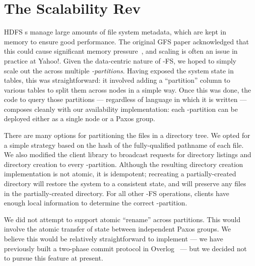 \section{The Scalability Rev}
\label{sec:scale}

HDFS {\NN}s manage large amounts of file system metadata, which are kept in
memory to ensure good performance. The original GFS paper acknowledged that this
could cause significant memory pressure~\cite{gfs-sosp}, and \NN scaling is
often an issue in practice at Yahoo!.  Given the data-centric nature of
\BOOM-FS, we hoped to simply scale out the \NN across multiple
\emph{\NN-partitions}. Having exposed the system state in tables, this was
straightforward: it involved adding a ``partition'' column to various tables to
split them across nodes in a simple way. Once this was done, the code to query
those partitions --- regardless of language in which it is written --- composes
cleanly with our availability implementation: each \NN-partition can be deployed
either as a single node or a Paxos group.

There are many options for partitioning the files in a directory tree.  We opted
for a simple strategy based on the hash of the fully-qualified pathname of each
file.  We also modified the client library to broadcast requests for directory
listings and directory creation to every \NN-partition.  Although the resulting
directory creation implementation is not atomic, it is idempotent; recreating a
partially-created directory will restore the system to a consistent state, and
will preserve any files in the partially-created directory. For all other
\BOOM-FS operations, clients have enough local information to determine the
correct \NN-partition. 

We did not attempt to support atomic ``rename'' across partitions. This would
involve the atomic transfer of state between independent Paxos groups.
We believe this would be relatively straightforward to implement --- we have
previously built a two-phase commit protocol in Overlog~\cite{netdb-declare} ---
but we decided not to pursue this feature at present.


